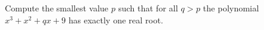 Compute the smallest value $p$ such that for all $q>p$ the polynomial $x^3+x^2+qx+9$ has exactly one real root.

